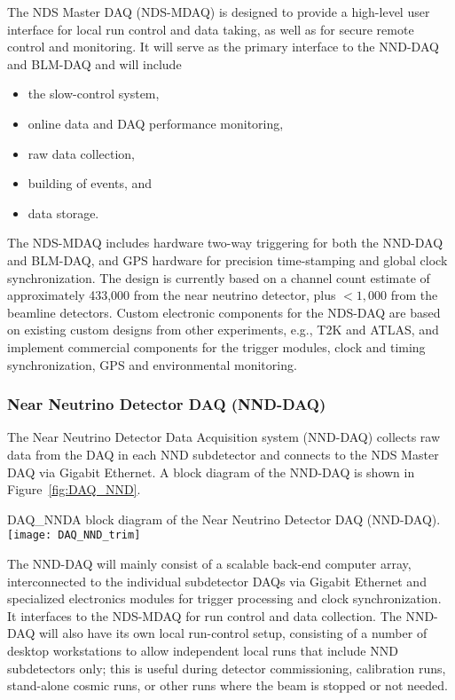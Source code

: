 The NDS Master DAQ (NDS-MDAQ) is designed to provide a high-level user
interface for local run control and data taking, as well as for secure
remote control and monitoring.  It will serve as the primary interface
to the NND-DAQ and BLM-DAQ and will include 
\begin{itemize}
\item the slow-control system,
\item online data and DAQ performance monitoring,  
\item raw data collection,
\item building of events, and
\item data storage.   
\end{itemize}
The NDS-MDAQ includes hardware two-way triggering for both the NND-DAQ
and BLM-DAQ, and GPS hardware for precision time-stamping and global
clock synchronization.  The design is currently based on a channel
count estimate of approximately 433,000 from the near neutrino
detector, plus $<1,000$ from the beamline detectors.  Custom
electronic components for the NDS-DAQ are based on existing custom
designs from other experiments, e.g., T2K and ATLAS, and implement
commercial components for the trigger modules, clock and timing
synchronization, GPS and environmental monitoring.


\subsubsection{Near Neutrino Detector DAQ (NND-DAQ)} 
\label{cdrsec:nd:nnd:daq}


The Near Neutrino Detector Data Acquisition system (NND-DAQ) collects
raw data from the DAQ in each NND subdetector and connects to the NDS
Master DAQ via Gigabit Ethernet. A block diagram of the NND-DAQ is
shown in Figure~\ref{fig:DAQ_NND}. 
\begin{cdrfigure}
{DAQ_NND}{A block diagram of the Near Neutrino Detector DAQ (NND-DAQ).}
\texttt{[image: DAQ\_NND\_trim]}
\end{cdrfigure}
The NND-DAQ will mainly consist of a scalable back-end computer array,
interconnected to the individual subdetector DAQs via Gigabit
Ethernet and specialized electronics modules for trigger processing
and clock synchronization. It interfaces to the NDS-MDAQ for run
control and data collection. The NND-DAQ will also have its own local
run-control setup, consisting of a number of desktop workstations to
allow independent local runs that include NND subdetectors only; this
is useful during detector commissioning, calibration runs, stand-alone
cosmic runs, or other runs where the beam is stopped or not needed.

